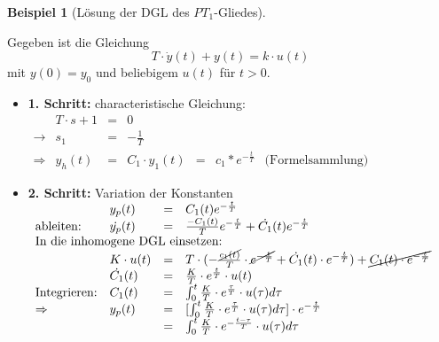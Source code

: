 \message{ !name(Mitschrieb_SysRegel.tex)}\documentclass[12pt,a4paper,ngerman]{scrartcl}
\newtheorem{bsp}{Beispiel}[section] %
\begin{document}
  \begin{bsp}[Lösung der DGL des $PT_1$-Gliedes]
\end{bsp}
Gegeben ist die Gleichung
\begin{equation*}
  T\cdot \dot{y}(t)+y(t)=k\cdot u(t)
\end{equation*}
mit $y(0)=y_0$ und beliebigem $u(t)$ für $t>0$.
\begin{itemize}
\item \textbf{1. Schritt:} characteristische Gleichung:\\
  \begin{math}
    \begin{array}{llllllll}
      &T\cdot s +1&=&0\\
      \rightarrow&s_1&=&-\frac{1}{T}\\
      \Rightarrow&y_h(t)&=&C_1\cdot y_1(t)&=&c_1*e^{-\frac{t}{T}}&\text{(Formelsammlung)}
    \end{array}
  \end{math}
\item \textbf{2. Schritt:} Variation der Konstanten\\
  \begin{math}
    \begin{array}{lllllllll}
                       &y_p(t)&=&C_1(t)e^{-\frac{t}{T}}\\
      \text{ableiten: }&\dot{y_p}(t)&=&\frac{-C_1(t)}{T}e^{-\frac{t}{T}}+\dot{C_1}(t)e^{-\frac{t}{T}}\\
\multicolumn{4}{l}{\text{In die inhomogene DGL einsetzen:}}\\
&K\cdot u(t)&=&T\cdot (-\frac{\cancel{c_1(t)}}{T}\cdot \cancel{e^{-\frac{t}{T}}}+\dot{C_1}(t)\cdot e^{-\frac{t}{T}})+\cancel{C_1(t)\cdot e^{-\frac{t}{T}}}\\
&\dot{C_1}(t)&=&\frac{K}{T}\cdot e^{\frac{t}{T}}\cdot u(t)\\
\text{Integrieren:}&C_1(t)&=&\int_0^t{\frac{K}{T}\cdot e^{\frac{\tau}{T}}\cdot u(\tau)d\tau}\\
\Rightarrow&y_p(t)&=&[\int_0^t{\frac{K}{T}\cdot e^{\frac{\tau}{T}}\cdot u(\tau)d\tau}]\cdot e^{-\frac{t}{T}}\\
&&=&\int_0^t{\frac{K}{T}\cdot e^{-\frac{t-\tau}{T}}\cdot u(\tau)d\tau}


\end{array}
\end{math}
\end{itemize}
\end{document}
